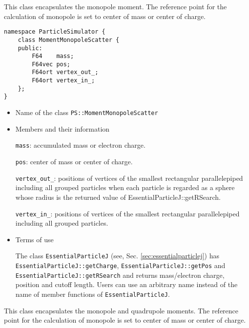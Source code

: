 
\label{sec:MomentMonopoleScatter}

This class encapsulates the monopole moment. The reference point for the calculation of monopole is set to center of mass or center of charge.

\begin{screen}
\begin{verbatim}
namespace ParticleSimulator {
    class MomentMonopoleScatter {
    public:
        F64    mass;
        F64vec pos;
        F64ort vertex_out_;
        F64ort vertex_in_;
    };
}
\end{verbatim}
\end{screen}

\begin{itemize}
\item Name of the class
  \texttt{PS::MomentMonopoleScatter}

\item Members and their information

  \texttt{mass}: accumulated mass or electron charge.

  \texttt{pos}: center of mass or center of charge.
        
  \texttt{vertex\_out\_}: positions of vertices of the smallest rectangular parallelepiped including all grouped particles when each particle is regarded as a sphere whose radius is the returned value of EssentialParticleJ::getRSearch.
  
  \texttt{vertex\_in\_}: positions of vertices of the smallest rectangular parallelepiped including all grouped particles.

\item Terms of use

  The class \texttt{EssentialParticleJ} (see, Sec. \ref{sec:essentialparticlej}) has \texttt{EssentialParticleJ::getCharge}, \texttt{EssentialParticleJ::getPos} and \texttt{EssentialParticleJ::getRSearch} and returns mass/electron charge, position and cutoff length. Users can use an arbitrary name instead of the name of member functions of \texttt{EssentialParticleJ}.

\end{itemize}

\label{sec:MomentQuadrupoleScatter}

This class encapsulates the monopole and quadrupole moments. The reference point for the calculation of monopole is set to center of mass or center of charge.

